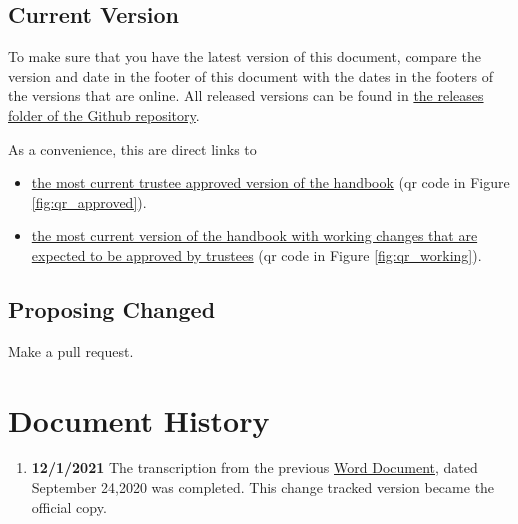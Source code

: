 \documentclass[letterpaper, 11pt]{article}
\begin{document}
	\subsection{Current Version}


		To make sure that you have the latest version of this document, compare the version and date in the
		footer of this document with the dates in the footers of the versions that are online.
		All released versions can be found in
		\href{https://github.com/djp3/WestmontFacultyHandbook/tree/main/releases}{the releases folder of the Github repository}.





		As a convenience, this are direct links to
		\begin{itemize}
			\item{ \href{https://github.com/djp3/WestmontFacultyHandbook/blob/main/releases/handbook.approved.pdf}{the most current trustee approved version of the handbook}
				(qr code in Figure \ref{fig:qr_approved})}.
			\item{ \href{https://github.com/djp3/WestmontFacultyHandbook/blob/main/releases/handbook.working.pdf}{the most current version of the handbook with working changes that are expected to be approved by trustees}
				(qr code in Figure \ref{fig:qr_working})}.
		\end{itemize}


	\subsection{Proposing Changed}
		Make a pull request.


\section{Document History}
	\begin{enumerate}
		\item{{\bfseries 12/1/2021} The transcription from the previous \href{https://drive.google.com/file/d/1sUKRM3r9zkCWEorlwJbBRCfkCduS1yGL/view}{Word Document}, dated September 24,2020 was completed. This change tracked version became the official copy.}
	\end{enumerate}
\end{document}
